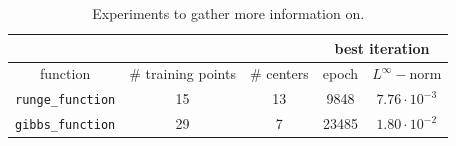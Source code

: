 \documentclass[12pt]{report} %
\begin{document}
\begin{table}[h]
\begin{tabular}{ccc|cc|}
\cline{4-5}
                                               &                                         &            & \multicolumn{2}{c|}{best iteration}                \\ \hline
\multicolumn{1}{|c|}{function}                 & \multicolumn{1}{c|}{\# training points} & \# centers & \multicolumn{1}{c|}{epoch} & $L^{\infty} -$norm    \\ \hline
\multicolumn{1}{|c|}{\texttt{runge\_function}} & \multicolumn{1}{c|}{15}                 & 13         & \multicolumn{1}{c|}{9848}  & $7.76 \cdot 10^{- 3}$ \\ \hline
\multicolumn{1}{|c|}{\texttt{gibbs\_function}} & \multicolumn{1}{c|}{29}                 & 7          & \multicolumn{1}{c|}{23485} & $1.80 \cdot 10^{- 2}$ \\ \hline
\end{tabular}
\caption{Experiments to gather more information
  on.}\label{table-compare-instances}
\end{table}
\end{document}

